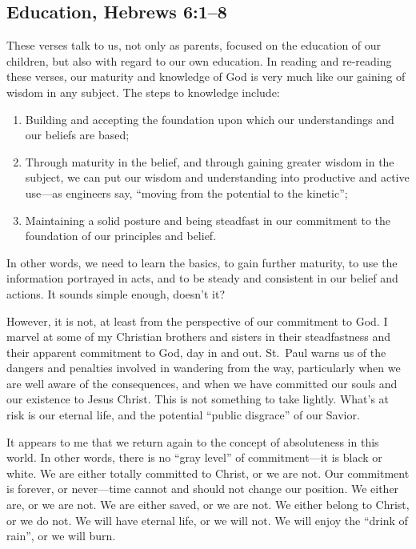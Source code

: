 \documentclass[12pt]{memoir}
\begin{document}
\subsection[Education]{Education, Hebrews 6:1--8}

These verses talk to us, not only as parents, focused on the education
of our children, but also with regard to our own education. In reading
and re-reading these verses, our maturity and knowledge of God is
very much like our gaining of wisdom in any subject. The steps to
knowledge include: 
\begin{enumerate}
\item Building and accepting the foundation upon which our understandings
and our beliefs are based; 
\item Through maturity in the belief, and through gaining greater wisdom
in the subject, we can put our wisdom and understanding into productive
and active use---as engineers say, ``moving from the potential to
the kinetic''; 
\item Maintaining a solid posture and being steadfast in our commitment
to the foundation of our principles and belief. 
\end{enumerate}
In other words, we need to learn the basics, to gain further maturity,
to use the information portrayed in acts, and to be steady and consistent
in our belief and actions. It sounds simple enough, doesn't it?

However, it is not, at least from the perspective of our commitment
to God. I marvel at some of my Christian brothers and sisters in their
steadfastness and their apparent commitment to God, day in and out.
St.~Paul warns us of the dangers and penalties involved in wandering from the way, particularly when we are well aware of the consequences,
and when we have committed our souls and our existence to Jesus Christ.
This is not something to take lightly. What's at risk is our eternal
life, and the potential ``public disgrace'' of our Savior.

It appears to me that we return again to the concept of absoluteness
in this world. In other words, there is no ``gray level'' of commitment---it
is black or white. We are either totally committed to Christ, or we
are not. Our commitment is forever, or never---time cannot and should
not change our position. We either are, or we are not. We are either
saved, or we are not. We either belong to Christ, or we do not. We
will have eternal life, or we will not. We will enjoy the ``drink
of rain'', or we will burn.
\end{document}
